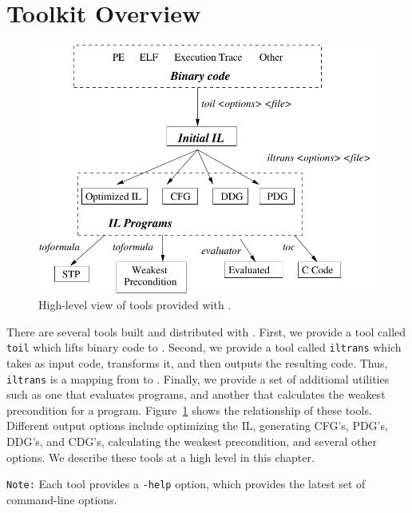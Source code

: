 \section{Toolkit Overview}

\begin{figure}
\centering
\includegraphics[scale=.8]{fig/toolchain}
\caption{High-level view of tools provided with \bap.}
\label{fig:toolchain-overview}
\end{figure}

There are several tools built and distributed with \bap. First, we
provide a tool called {\tt toil} which lifts binary code to \bil.
Second, we provide a tool called {\tt iltrans} which takes as input
\bil code, transforms it, and then outputs the resulting \bil
code. Thus, {\tt iltrans} is a mapping from \bil to \bil.  Finally, we
provide a set of additional utilities such as one that evaluates \bil
programs, and another that calculates the weakest precondition for a
\bil program. Figure~\ref{fig:toolchain-overview} shows the
relationship of these tools.  Different output options include
optimizing the IL, generating CFG's, PDG's, DDG's, and CDG's,
calculating the weakest precondition, and several other options. We
describe these tools at a high level in this chapter. 

{\tt Note:} Each tool provides a {\tt -help} option, which provides
the latest set of command-line options.







